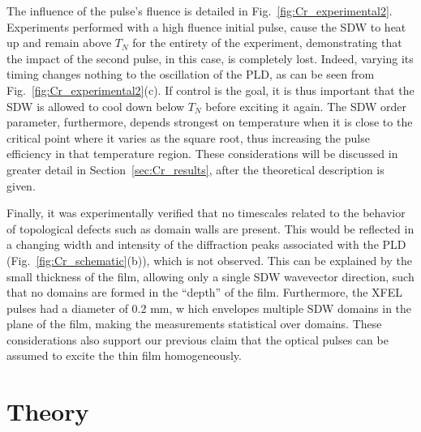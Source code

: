 The influence of the pulse's fluence is detailed in Fig.~\ref{fig:Cr_experimental2}.
Experiments performed with a high fluence initial pulse, cause the SDW to heat up and remain above $T_N$ for the entirety of the experiment, demonstrating that the impact of the second pulse, in this case, is completely lost. Indeed, varying its timing changes nothing to the oscillation of the PLD, as can be seen from Fig.~\ref{fig:Cr_experimental2}(c).
If control is the goal, it is thus important that the SDW is allowed to cool down below $T_N$ before exciting it again.
The SDW order parameter, furthermore, depends strongest on temperature when it is close to the critical point where it varies as the square root, thus increasing the pulse efficiency in that temperature region.
These considerations will be discussed in greater detail in Section~\ref{sec:Cr_results}, after the theoretical description is given.

Finally, it was experimentally verified that no timescales related to the behavior of topological defects such as domain walls are present. This would be reflected in a changing width and intensity of the diffraction peaks associated with the PLD (Fig.~\ref{fig:Cr_schematic}(b)), which is not observed. This can be explained by the small thickness of the film, allowing only a single SDW wavevector direction, such that no domains are formed in the ``depth'' of the film. Furthermore, the XFEL pulses had a diameter of 0.2 mm, w hich envelopes multiple SDW domains in the plane of the film\cite{Nicholson2016}, making the measurements statistical over domains.
These considerations also support our previous claim that the optical pulses can be assumed to excite the thin film homogeneously. 
\section{Theory \label{sec:Cr_model}}


